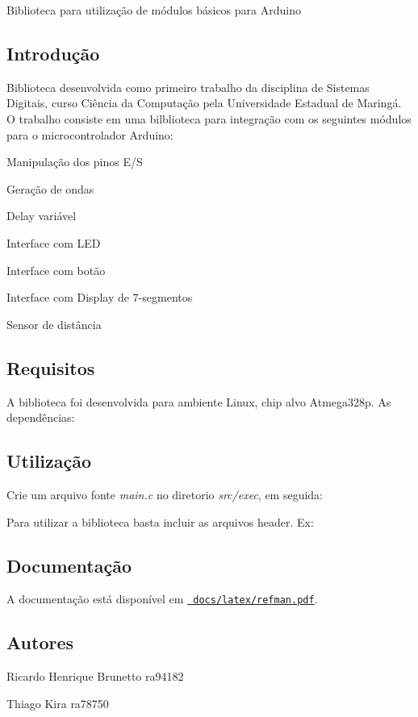 Biblioteca para utilização de módulos básicos para Arduino

\subsection*{Introdução}

Biblioteca desenvolvida como primeiro trabalho da disciplina de Sistemas Digitais, curso Ciência da Computação pela Universidade Estadual de Maringá. O trabalho consiste em uma bilblioteca para integração com os seguintes módulos para o microcontrolador Arduino\+:


\begin{DoxyItemize}
\item Manipulação dos pinos E/S
\item Geração de ondas
\item Delay variável
\item Interface com L\+ED
\item Interface com botão
\item Interface com Display de 7-\/segmentos
\item Sensor de distância
\end{DoxyItemize}

\subsection*{Requisitos}

A biblioteca foi desenvolvida para ambiente Linux, chip alvo Atmega328p. As dependências\+:


\begin{DoxyCode}{0}
\end{DoxyCode}


\subsection*{Utilização}

Crie um arquivo fonte {\itshape main.\+c} no diretorio {\itshape src/exec}, em seguida\+: 
\begin{DoxyCode}{0}
\end{DoxyCode}


Para utilizar a biblioteca basta incluir as arquivos header. Ex\+:


\begin{DoxyCode}{0}
\end{DoxyCode}


\subsection*{Documentação}

A documentação está disponível em \href{docs/latex/refman.pdf}\texttt{ docs/latex/refman.\+pdf}.

\subsection*{Autores}

Ricardo Henrique Brunetto ra94182

Thiago Kira ra78750 